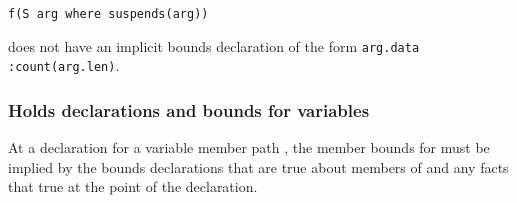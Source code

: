 \begin{lstlisting}
f(S arg where suspends(arg))
\end{lstlisting}

does not have an implicit bounds declaration of the form \lstinline|arg.data :count(arg.len)|.

\subsubsection{Holds declarations and bounds for variables}

At a  declaration for a variable member path ,
the member bounds for  must be implied by the bounds
declarations that are true about members of  and any facts that 
true at the point of the  declaration.





